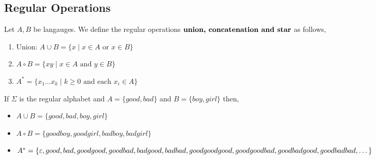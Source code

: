 \subsection{Regular Operations}
\begin{definition}
Let $A, B$ be langauges. We define the regular operations $\textbf{union, concatenation} \\
\textbf{ and star} $ as follows, 
    \begin{enumerate}
        \item Union: $A \cup B = \{x \mid x \in A \text{ or } x \in B\}$
        \item $A \circ B = \{xy \mid x \in A \text{ and } y \in B\}$
        \item $A^{*} = \{x_{1}\dots x_k \mid k \ge 0 \text{ and each }x_i \in A\}$
    \end{enumerate}
\end{definition}
\begin{eg}
    If $\Sigma$ is the regular alphabet and $A = \{good, bad\}$ and $B = \{boy, girl\}$ then,
    \begin{itemize}
        \item $A \cup B = \{good, bad, boy, girl\}$
        \item $A \circ B = \{goodboy, goodgirl, badboy, badgirl\} $
        \item $A^{*} = \{\epsilon, good, bad, goodgood, goodbad, badgood, badbad, goodgoodgood,\\goodgoodbad,goodbadgood,goodbadbad, \dots\}$
    \end{itemize}
\end{eg}


